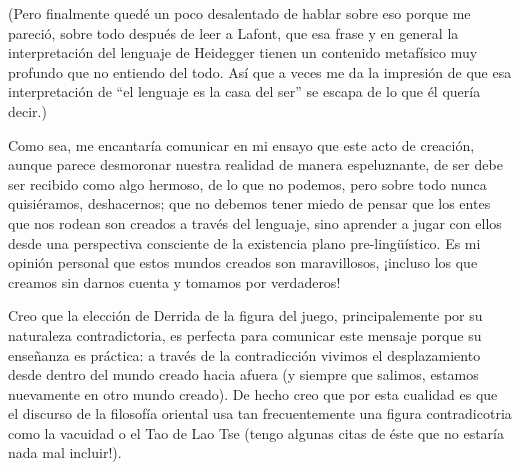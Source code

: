 (Pero finalmente quedé un poco desalentado de
hablar sobre eso porque me pareció, sobre
todo después de leer a Lafont, que esa frase
y en general la interpretación del lenguaje
de Heidegger tienen un contenido metafísico
muy profundo que no entiendo del todo. Así
que a veces me da la impresión de que esa
interpretación de ``el lenguaje es la casa
del ser'' se escapa de lo que él quería
decir.)

Como sea, me encantaría comunicar en mi
ensayo que este acto de creación, aunque
parece desmoronar nuestra realidad de manera
espeluznante, de ser debe ser recibido como
algo hermoso, de lo que no podemos, pero
sobre todo nunca quisiéramos, deshacernos;
que no debemos tener miedo de pensar que los
entes que nos rodean son creados a través del
lenguaje, sino aprender a jugar con ellos
desde una perspectiva consciente de la
existencia plano pre-lingüístico. Es mi
opinión personal que estos mundos creados son
maravillosos, ¡incluso los que creamos sin
darnos cuenta y tomamos por verdaderos!

Creo que la elección de Derrida de la figura
del juego, principalemente por su naturaleza
contradictoria, es perfecta para comunicar
este mensaje porque su enseñanza es práctica:
a través de la contradicción vivimos el
desplazamiento desde dentro del mundo creado
hacia afuera (y siempre que salimos, estamos
nuevamente en otro mundo creado). De hecho
creo que por esta cualidad es que el discurso
de la filosofía oriental usa tan
frecuentemente una figura contradicotria como
la vacuidad o el Tao de Lao Tse (tengo
algunas citas de éste que no estaría nada mal
incluir!).






